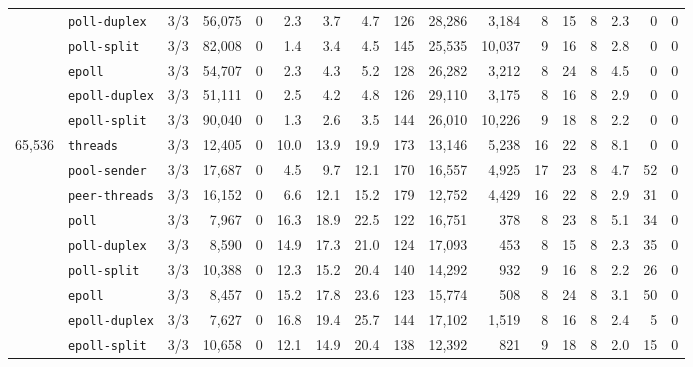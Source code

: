 \begin{longtable}{@{}llrrrrrrrrrrrrrrr@{}}
 & \texttt{poll-duplex} & 3/3 & 56{,}075 & 0 & 2.3 & 3.7 & 4.7 & 126 & 28{,}286 & 3{,}184 & 8 & 15 & 8 & 2.3 & 0 & 0 \\
 & \texttt{poll-split} & 3/3 & 82{,}008 & 0 & 1.4 & 3.4 & 4.5 & 145 & 25{,}535 & 10{,}037 & 9 & 16 & 8 & 2.8 & 0 & 0 \\
 & \texttt{epoll} & 3/3 & 54{,}707 & 0 & 2.3 & 4.3 & 5.2 & 128 & 26{,}282 & 3{,}212 & 8 & 24 & 8 & 4.5 & 0 & 0 \\
 & \texttt{epoll-duplex} & 3/3 & 51{,}111 & 0 & 2.5 & 4.2 & 4.8 & 126 & 29{,}110 & 3{,}175 & 8 & 16 & 8 & 2.9 & 0 & 0 \\
 & \texttt{epoll-split} & 3/3 & 90{,}040 & 0 & 1.3 & 2.6 & 3.5 & 144 & 26{,}010 & 10{,}226 & 9 & 18 & 8 & 2.2 & 0 & 0 \\
\midrule
65{,}536 & \texttt{threads} & 3/3 & 12{,}405 & 0 & 10.0 & 13.9 & 19.9 & 173 & 13{,}146 & 5{,}238 & 16 & 22 & 8 & 8.1 & 0 & 0 \\
 & \texttt{pool-sender} & 3/3 & 17{,}687 & 0 & 4.5 & 9.7 & 12.1 & 170 & 16{,}557 & 4{,}925 & 17 & 23 & 8 & 4.7 & 52 & 0 \\
 & \texttt{peer-threads} & 3/3 & 16{,}152 & 0 & 6.6 & 12.1 & 15.2 & 179 & 12{,}752 & 4{,}429 & 16 & 22 & 8 & 2.9 & 31 & 0 \\
 & \texttt{poll} & 3/3 & 7{,}967 & 0 & 16.3 & 18.9 & 22.5 & 122 & 16{,}751 & 378 & 8 & 23 & 8 & 5.1 & 34 & 0 \\
 & \texttt{poll-duplex} & 3/3 & 8{,}590 & 0 & 14.9 & 17.3 & 21.0 & 124 & 17{,}093 & 453 & 8 & 15 & 8 & 2.3 & 35 & 0 \\
 & \texttt{poll-split} & 3/3 & 10{,}388 & 0 & 12.3 & 15.2 & 20.4 & 140 & 14{,}292 & 932 & 9 & 16 & 8 & 2.2 & 26 & 0 \\
 & \texttt{epoll} & 3/3 & 8{,}457 & 0 & 15.2 & 17.8 & 23.6 & 123 & 15{,}774 & 508 & 8 & 24 & 8 & 3.1 & 50 & 0 \\
 & \texttt{epoll-duplex} & 3/3 & 7{,}627 & 0 & 16.8 & 19.4 & 25.7 & 144 & 17{,}102 & 1{,}519 & 8 & 16 & 8 & 2.4 & 5 & 0 \\
 & \texttt{epoll-split} & 3/3 & 10{,}658 & 0 & 12.1 & 14.9 & 20.4 & 138 & 12{,}392 & 821 & 9 & 18 & 8 & 2.0 & 15 & 0 \\
\end{longtable}

